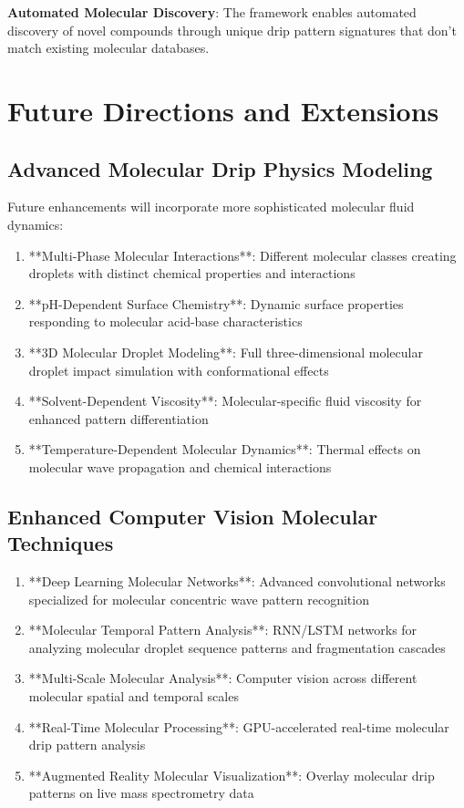 \documentclass[12pt,a4paper]{article}
\begin{document}
\textbf{Automated Molecular Discovery}: The framework enables automated discovery of novel compounds through unique drip pattern signatures that don't match existing molecular databases.

\section{Future Directions and Extensions}

\subsection{Advanced Molecular Drip Physics Modeling}

Future enhancements will incorporate more sophisticated molecular fluid dynamics:

\begin{enumerate}
\item **Multi-Phase Molecular Interactions**: Different molecular classes creating droplets with distinct chemical properties and interactions
\item **pH-Dependent Surface Chemistry**: Dynamic surface properties responding to molecular acid-base characteristics
\item **3D Molecular Droplet Modeling**: Full three-dimensional molecular droplet impact simulation with conformational effects
\item **Solvent-Dependent Viscosity**: Molecular-specific fluid viscosity for enhanced pattern differentiation
\item **Temperature-Dependent Molecular Dynamics**: Thermal effects on molecular wave propagation and chemical interactions
\end{enumerate}

\subsection{Enhanced Computer Vision Molecular Techniques}

\begin{enumerate}
\item **Deep Learning Molecular Networks**: Advanced convolutional networks specialized for molecular concentric wave pattern recognition
\item **Molecular Temporal Pattern Analysis**: RNN/LSTM networks for analyzing molecular droplet sequence patterns and fragmentation cascades
\item **Multi-Scale Molecular Analysis**: Computer vision across different molecular spatial and temporal scales
\item **Real-Time Molecular Processing**: GPU-accelerated real-time molecular drip pattern analysis
\item **Augmented Reality Molecular Visualization**: Overlay molecular drip patterns on live mass spectrometry data
\end{enumerate}
\end{document}
